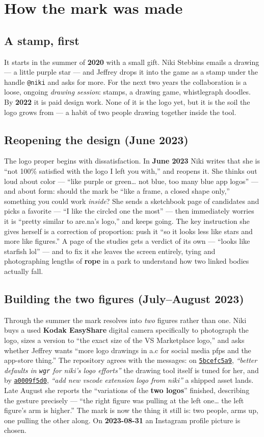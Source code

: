\documentclass[10pt,letterpaper,twocolumn]{article}
\newcommand{\commit}[2]{\href{https://github.com/whistlegraph/aesthetic-computer/commit/#1}{\texttt{#1}}, \emph{``#2''}}
\begin{document}
\section{How the mark was made}

\subsection{A stamp, first}
It starts in the summer of \textbf{2020} with a small gift. Niki Stebbins
emails a drawing --- a little purple star --- and Jeffrey drops it into the
game as a stamp under the handle \texttt{@niki} and asks for more. For the
next two years the collaboration is a loose, ongoing \emph{drawing session}:
stamps, a drawing game, whistlegraph doodles. By \textbf{2022} it is paid
design work. None of it is the logo yet, but it is the soil the logo grows
from --- a habit of two people drawing together inside the tool.

\subsection{Reopening the design (June 2023)}
The logo proper begins with dissatisfaction. In \textbf{June 2023} Niki
writes that she is ``not 100\% satisfied with the logo I left you with,''
and reopens it. She thinks out loud about color --- ``like purple or
green\dots{} not blue, too many blue app logos'' --- and about form: should
the mark be ``like a frame, a closed shape only,'' something you could work
\emph{inside}? She sends a sketchbook page of candidates and picks a
favorite --- ``I like the circled one the most'' --- then immediately
worries it is ``pretty similar to are.na's logo,'' and keeps going. The key
instruction she gives herself is a correction of proportion: push it ``so it
looks less like stars and more like figures.'' A page of the studies gets a
verdict of its own --- ``looks like starfish lol'' --- and to fix it she
leaves the screen entirely, tying and photographing lengths of \textbf{rope}
in a park to understand how two linked bodies actually fall.

\subsection{Building the two figures (July--August 2023)}
Through the summer the mark resolves into \emph{two} figures rather than one.
Niki buys a used \textbf{Kodak EasyShare} digital camera specifically to
photograph the logo, sizes a version to ``the exact size of the VS
Marketplace logo,'' and asks whether Jeffrey wants ``more logo drawings in
a.c for social media pfps and the app-store thing.'' The repository agrees
with the messages: on \commit{5bcefc5a9}{better defaults in \texttt{wgr} for
niki's logo efforts} the drawing tool itself is tuned for her, and by
\commit{a0009f5d0}{add new vscode extension logo from niki} a shipped asset
lands. Late August she reports the ``variations of the \textbf{two logos}''
finished, describing the gesture precisely --- ``the right figure was
pulling at the left one\dots{} the left figure's arm is higher.'' The mark is
now the thing it still is: two people, arms up, one pulling the other along.
On \textbf{2023-08-31} an Instagram profile picture is chosen.
\end{document}
